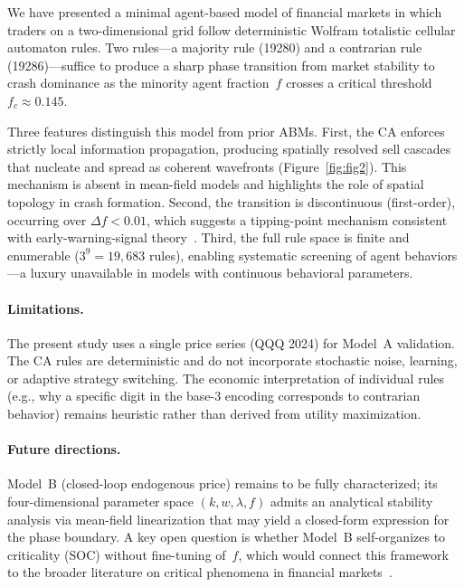 
We have presented a minimal agent-based model of financial markets in which traders
on a two-dimensional grid follow deterministic Wolfram totalistic cellular automaton
rules. Two rules---a majority rule (19280) and a contrarian rule (19286)---suffice
to produce a sharp phase transition from market stability to crash dominance as the
minority agent fraction~$f$ crosses a critical threshold $f_c \approx 0.145$.

Three features distinguish this model from prior ABMs. First, the CA enforces
strictly local information propagation, producing spatially resolved sell cascades
that nucleate and spread as coherent wavefronts (Figure~\ref{fig:fig2}). This
mechanism is absent in mean-field models and highlights the role of spatial topology
in crash formation. Second, the transition is discontinuous (first-order), occurring
over $\Delta f < 0.01$, which suggests a tipping-point mechanism consistent with
early-warning-signal theory~\cite{scheffer2009early}. Third, the full rule space is
finite and enumerable ($3^9 = 19{,}683$ rules), enabling systematic screening of
agent behaviors---a luxury unavailable in models with continuous behavioral parameters.

\paragraph{Limitations.}
The present study uses a single price series (QQQ 2024) for Model~A validation.
The CA rules are deterministic and do not incorporate stochastic noise, learning,
or adaptive strategy switching. The economic interpretation of individual rules
(e.g., why a specific digit in the base-3 encoding corresponds to contrarian behavior)
remains heuristic rather than derived from utility maximization.

\paragraph{Future directions.}
Model~B (closed-loop endogenous price) remains to be fully characterized; its
four-dimensional parameter space $(k, w, \lambda, f)$ admits an analytical stability
analysis via mean-field linearization that may yield a closed-form expression for
the phase boundary. A key open question is whether Model~B self-organizes to
criticality (SOC) without fine-tuning of~$f$, which would connect this framework
to the broader literature on critical phenomena in financial
markets~\cite{sornette2017why,gabaix2003theory}.
